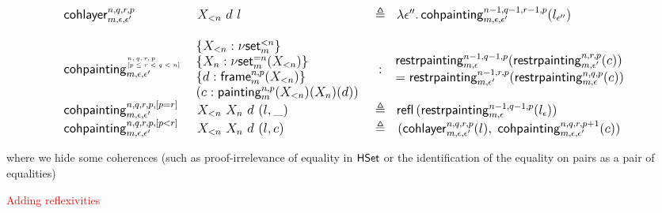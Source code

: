 \documentclass[12pt,landscape]{article}
\newcommand{\refl}[1]{\mathsf{refl}\,{#1}}
\newcommand{\defeq}{\triangleq}
\newcommand{\partialcubset}[2]{\mathsf{\nu set}_{#1}^{<#2}}
\newcommand{\mycubsetcomp}[2]{\mathsf{\nu set}_{#1}^{=#2}}
\newcommand{\mybox}[1]{\mathsf{frame}_{#1}}
\newcommand{\mycube}[1]{\mathsf{painting}_{#1}}
\newcommand{\downcube}[2]{\mathsf{restrpainting}_{#1,#2}}
\newcommand{\cohlayer}[2]{\mathsf{cohlayer}_{#1,#2}}
\newcommand{\cohcube}[2]{\mathsf{cohpainting}_{#1,#2}}
\begin{document}
\begin{LARGE}
\begin{sf}
$$\begin{large}
\begin{array}{llcl}
\cohlayer{m}{\epsilon,\epsilon'}^{n,q,r,p} & X_{<n}~d~l & \defeq & \lambda\epsilon''.\,\cohcube{m}{\epsilon,\epsilon'}^{n-1,q-1,r-1,p}(l_{\epsilon''})\\
\\
\cohcube{m}{\epsilon,\epsilon'}^{\!\!\!\tiny\begin{array}{l}n,q,r,p\\\mbox{}[p \leq r < q < n]\end{array}} & \!\!\!\begin{array}{l}\{X_{<n}:\partialcubset{m}{n}\}\\\{X_n:\mycubsetcomp{m}{n}(X_{<n})\}\\\{d:\mybox{m}^{n,p}(X_{<n})\}\\(c:\mycube{m}^{n,p}(X_{<n})(X_n)(d))\end{array}& : & \!\!\!\begin{array}{ll}\downcube{m}{\epsilon}^{n-1,q-1,p}(\downcube{m}{\epsilon'}^{n,r,p}(c)) \\ = \downcube{m}{\epsilon'}^{n-1,r,p}(\downcube{m}{\epsilon}^{n,q,p}(c))\end{array}\\
\cohcube{m}{\epsilon,\epsilon'}^{n,q,r,p,[p=r]} & X_{<n}~X_n~d~(l,\_) & \defeq & \refl({\downcube{m}{\epsilon}^{n-1,q-1,p}(l_{\epsilon})})\\
\cohcube{m}{\epsilon,\epsilon'}^{n,q,r,p,[p<r]} & X_{<n}~X_n~d~(l,c) & \defeq & \!\!\begin{array}{l}(\cohlayer{m}{\epsilon,\epsilon'}^{n,q,r,p}(l),\;\cohcube{m}{\epsilon,\epsilon'}^{n,q,r,p+1}(c))\end{array}\\
\end{array}
\end{large}
$$

\bigskip

\noindent where we hide some coherences (such as proof-irrelevance of
equality in $\mathsf{HSet}$ or the identification of the equality on pairs as
a pair of equalities)

\newpage

\begin{center}
\textcolor{red}{\huge Adding reflexivities}
\end{center}

\iffalse
\newcommand{\myreflset}{\textsf{reflSet}}


\end{sf}
\end{LARGE}
\end{document}
